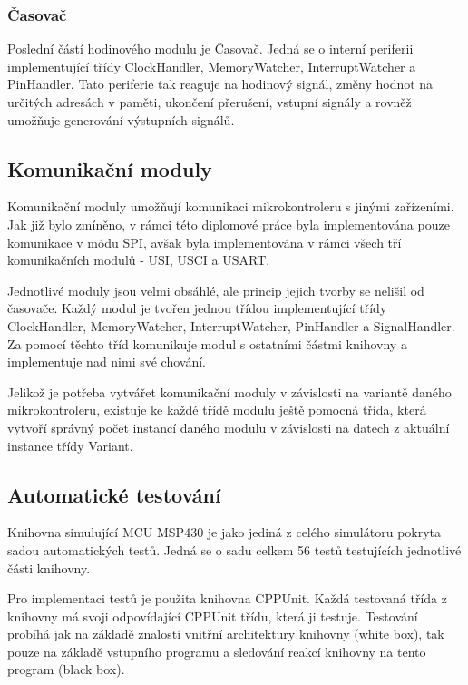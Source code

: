 \subsubsection{Časovač}

Poslední částí hodinového modulu je Časovač. Jedná se o interní periferii implementující třídy ClockHandler, MemoryWatcher, InterruptWatcher a PinHandler. Tato periferie tak reaguje na hodinový signál, změny hodnot na určitých adresách v paměti, ukončení přerušení, vstupní signály a rovněž umožňuje generování výstupních signálů.


\subsection{Komunikační moduly}

Komunikační moduly umožňují komunikaci mikrokontroleru s jinými zařízeními. Jak již bylo zmíněno, v rámci této diplomové práce byla implementována pouze komunikace v módu SPI, avšak byla implementována v rámci všech tří komunikačních modulů - USI, USCI a USART.

Jednotlivé moduly jsou velmi obsáhlé, ale princip jejich tvorby se nelišil od časovače. Každý modul je tvořen jednou třídou implementující třídy ClockHandler, MemoryWatcher, InterruptWatcher, PinHandler a SignalHandler. Za pomocí těchto tříd komunikuje modul s ostatními částmi knihovny a implementuje nad nimi své chování.

Jelikož je potřeba vytvářet komunikační moduly v závislosti na variantě daného mikrokontroleru, existuje ke každé třídě modulu ještě pomocná třída, která vytvoří správný počet instancí daného modulu v závislosti na datech z aktuální instance třídy Variant.

\subsection{Automatické testování}

Knihovna simulující MCU MSP430 je jako jediná z celého simulátoru pokryta sadou automatických testů. Jedná se o sadu celkem 56 testů testujících jednotlivé části knihovny.

Pro implementaci testů je použita knihovna CPPUnit. Každá testovaná třída z knihovny má svoji odpovídající CPPUnit třídu, která ji testuje. Testování probíhá jak na základě znalostí vnitřní architektury knihovny (white box), tak pouze na základě vstupního programu a sledování reakcí knihovny na tento program (black box).

